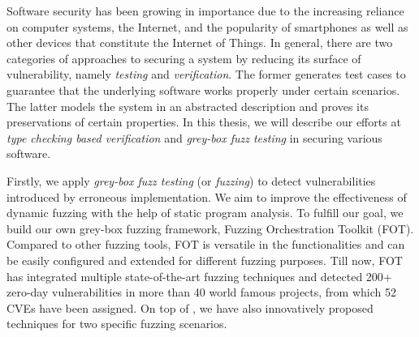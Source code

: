 Software security has been growing in importance due to the increasing reliance on computer systems, the Internet, and the popularity of smartphones as well as other devices that constitute the Internet of Things.
In general, there are two categories of approaches to securing a system by reducing its surface of vulnerability, namely \emph{testing} and \emph{verification}. The former
 generates test cases to guarantee that the underlying software works properly under certain scenarios.
 The latter models the system in an abstracted description and proves its preservations of certain properties.
  In this thesis, we will describe our efforts at \emph{type checking based verification} and \emph{grey-box fuzz testing} in securing various software.

Firstly, we apply \emph{grey-box fuzz testing} (or \emph{fuzzing}) to detect vulnerabilities introduced by erroneous implementation. We aim to improve the effectiveness of dynamic fuzzing with the help of static program analysis. To fulfill our goal, we build our own grey-box fuzzing framework, Fuzzing Orchestration Toolkit (FOT). Compared to other fuzzing tools, FOT is versatile in the functionalities and can be easily configured and extended for different fuzzing purposes. Till now, FOT has integrated multiple state-of-the-art fuzzing techniques and detected 200+ zero-day vulnerabilities in more than 40 world famous projects, from which 52 CVEs have been assigned.
On top of \FOT, we have also innovatively proposed techniques for two specific fuzzing scenarios.

